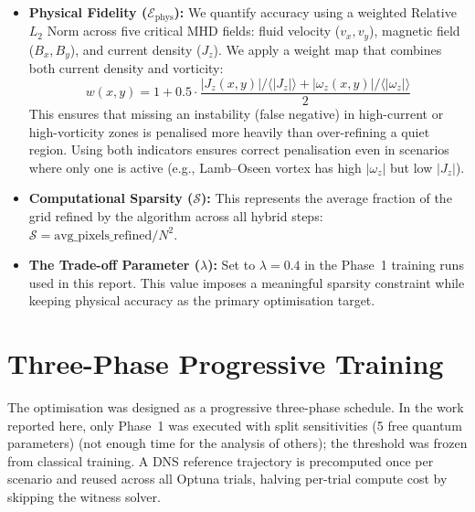 \documentclass[12pt, a4paper, oneside]{report}
\begin{document}
\begin{itemize}
    \item \textbf{Physical Fidelity ($\mathcal{E}_{\text{phys}}$):} We quantify accuracy using a weighted Relative $L_2$ Norm across five critical MHD fields: fluid velocity ($v_x, v_y$), magnetic field ($B_x, B_y$), and current density ($J_z$). We apply a weight map that combines both current density and vorticity:
    \begin{equation}
        w(x,y) = 1 + 0.5 \cdot \frac{|J_z(x,y)| / \langle|J_z|\rangle + |\omega_z(x,y)| / \langle|\omega_z|\rangle}{2}
    \end{equation}
    This ensures that missing an instability (false negative) in high-current or high-vorticity zones is penalised more heavily than over-refining a quiet region. Using both indicators ensures correct penalisation even in scenarios where only one is active (e.g., Lamb--Oseen vortex has high $|\omega_z|$ but low $|J_z|$).

    \item \textbf{Computational Sparsity ($\mathcal{S}$):} This represents the average fraction of the grid refined by the algorithm across all hybrid steps: $\mathcal{S} = \text{avg\_pixels\_refined} / N^2$.

    \item \textbf{The Trade-off Parameter ($\lambda$):} Set to $\lambda = 0.4$ in the Phase~1 training runs used in this report. This value imposes a meaningful sparsity constraint while keeping physical accuracy as the primary optimisation target.
\end{itemize}

\section{Three-Phase Progressive Training}
\label{sec:multi-scenario-training}
The optimisation was designed as a progressive three-phase schedule. In the work reported here, only Phase~1 was executed with split sensitivities (5 free quantum parameters) (not enough time for the analysis of others); the threshold was frozen from classical training. A DNS reference trajectory is precomputed once per scenario and reused across all Optuna trials, halving per-trial compute cost by skipping the witness solver.
\end{document}
